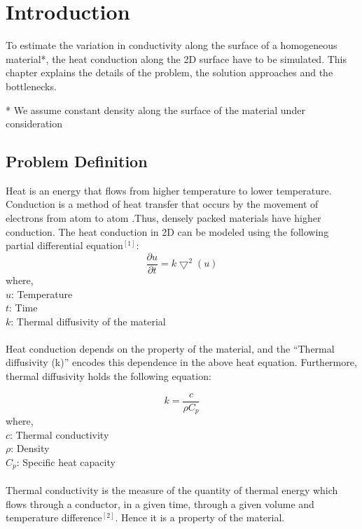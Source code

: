 \documentclass[10pt,a4paper]{report}
\begin{document}
\tableofcontents
\thispagestyle{empty}


\chapter{Introduction}
To estimate the variation in conductivity along the surface of a homogeneous material*, the heat conduction along the 2D surface have to be simulated. This chapter explains the details of the problem, the solution approaches and the bottlenecks.\\

\begin{small}
\begin{flushleft}
 *  We assume constant density along the surface of the material under consideration
 \end{flushleft} 
\end{small}

\section{Problem Definition}
Heat is an energy that flows from higher temperature to lower temperature. Conduction is a method of heat transfer that occurs by  the movement of electrons from atom to atom .Thus, densely packed materials have higher conduction. The heat conduction in 2D can be modeled using the following partial differential equation$^{[1]}$:
\begin{equation}
\frac{\partial u}{\partial t}=k \bigtriangledown^2(u)
\end{equation}
where,\\
$u$: Temperature\\
$t$: Time\\
$k$: Thermal diffusivity of the material\\
\\
Heat conduction depends on the property of the material, and the “Thermal diffusivity (k)” encodes this dependence in the above heat equation. Furthermore, thermal diffusivity holds the following equation: 

\begin{equation}
k=\frac{c}{\rho C_p}
\end{equation}
where,\\
$c$: Thermal conductivity\\
$\rho$: Density\\
$C_p$: Specific heat capacity\\
\\
Thermal conductivity is the measure of the quantity of thermal energy which flows through a conductor, in a given time, through a given volume and temperature difference$^{[2]}$. Hence it is a property of the material.
\end{document}
